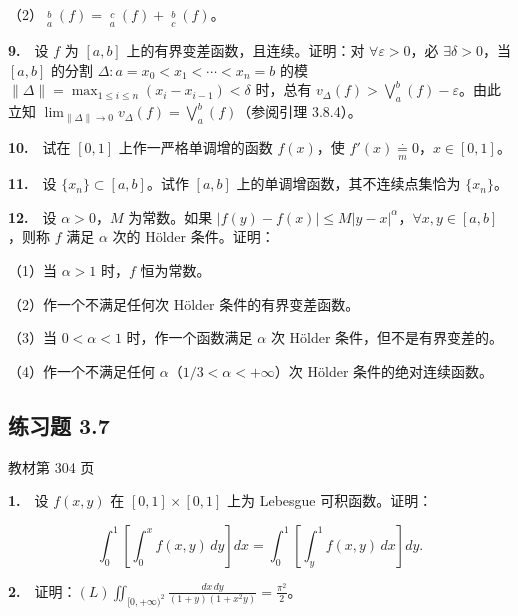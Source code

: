 \documentclass[11pt,a4paper]{article}
\begin{document}
（2）\(\mathop{\bigvee\nolimits^{-}}\limits_a^b(f)=\mathop{\bigvee\nolimits^{-}}\limits_a^c(f)+\mathop{\bigvee\nolimits^{-}}\limits_c^b(f)\)。

\par{}\noindent \textbf{9.}　设 \(f\) 为 \([a,b]\) 上的有界变差函数，且连续。证明：对 \(\forall\varepsilon>0\)，必 \(\exists\delta>0\)，当 \([a,b]\) 的分割 \(\Delta:a=x_0<x_1<\cdots<x_n=b\) 的模 \(\|\Delta\|=\max_{1\le i\le n}(x_i-x_{i-1})<\delta\) 时，总有 \(v_\Delta(f)>\bigvee_a^b(f)-\varepsilon\)。由此立知 \(\lim_{\|\Delta\|\to0}v_\Delta(f)=\bigvee_a^b(f)\)（参阅引理 3.8.4）。

\par{}\noindent \textbf{10.}　试在 \([0,1]\) 上作一严格单调增的函数 \(f(x)\)，使 \(f'(x)\underset{m}{\overset{\cdot}{=}}0\)，\(x\in[0,1]\)。

\par{}\noindent \textbf{11.}　设 \(\{x_n\}\subset[a,b]\)。试作 \([a,b]\) 上的单调增函数，其不连续点集恰为 \(\{x_n\}\)。

\par{}\noindent \textbf{12.}　设 \(\alpha>0\)，\(M\) 为常数。如果 \(|f(y)-f(x)|\le M|y-x|^\alpha\)，\(\forall x,y\in[a,b]\)，则称 \(f\) 满足 \(\alpha\) 次的 Hölder 条件。证明：

（1）当 \(\alpha>1\) 时，\(f\) 恒为常数。

（2）作一个不满足任何次 Hölder 条件的有界变差函数。

（3）当 \(0<\alpha<1\) 时，作一个函数满足 \(\alpha\) 次 Hölder 条件，但不是有界变差的。

（4）作一个不满足任何 \(\alpha\)（\(1/3<\alpha<+\infty\)）次 Hölder 条件的绝对连续函数。


\hypertarget{ex7}{}\subsection*{练习题 3.7}
\noindent 教材第 304 页

\par{}\noindent \textbf{1.}　设 \(f(x,y)\) 在 \([0,1]\times[0,1]\) 上为 Lebesgue 可积函数。证明：

\[
\int_0^1\left[\int_0^x f(x,y)\,dy\right]dx=\int_0^1\left[\int_y^1 f(x,y)\,dx\right]dy.
\]

\par{}\noindent \textbf{2.}　证明：\(\displaystyle (L)\iint_{[0,+\infty)^2}\frac{dx\,dy}{(1+y)(1+x^2y)}=\frac{\pi^2}{2}\)。
\end{document}
